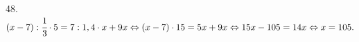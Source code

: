 48. $(x-7): \cfrac{1}{3}\cdot 5=7: 1,4\cdot x+9x\Leftrightarrow(x-7)\cdot15=5x+9x\Leftrightarrow
15x-105=14x\Leftrightarrow x=105.$\\

